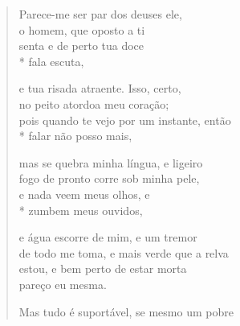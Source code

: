 \pagebreak
\begin{verse}
Parece-me ser par dos deuses ele,\\
o homem, que oposto a ti\\
senta e de perto tua doce\\*
fala escuta,

e tua risada atraente. Isso, certo,\\
no peito atordoa meu coração;\\
pois quando te vejo por um instante, então\\*
falar não posso mais,

mas se quebra minha língua, e ligeiro\\
fogo de pronto corre sob minha pele,\\
e nada veem meus olhos, e\\*
zumbem meus ouvidos,

e água escorre de mim, e um tremor\\
de todo me toma, e mais verde que a relva\\
estou, e bem perto de estar morta\\
pareço eu mesma.

Mas tudo é suportável, se mesmo um pobre 
\end{verse}

\medskip

